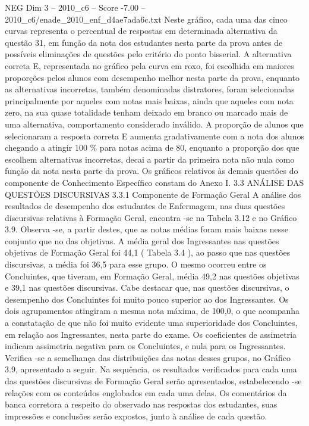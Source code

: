 \begin{textsample}{NEG Dim 3 – 2010\_c6 – Score -7.00 – 2010\_c6/enade\_2010\_enf\_d4ae7ada6c.txt}
Neste gráfico, cada uma das cinco curvas representa o percentual de respostas em determinada alternativa da questão 31, em função da nota dos estudantes nesta parte da prova antes de possíveis eliminações de questões pelo critério do ponto bisserial.
A alternativa correta E, representada no gráfico pela curva em roxo, foi escolhida em maiores proporções pelos alunos com desempenho melhor nesta parte da prova, enquanto as alternativas incorretas, também denominadas distratores, foram selecionadas principalmente por aqueles com notas mais baixas, ainda que aqueles com nota zero, na sua quase totalidade tenham deixado em branco ou marcado mais de uma alternativa, comportamento considerado inválido.
A proporção de alunos que selecionaram a resposta correta E aumenta gradativamente com a nota dos alunos chegando a atingir 100 \% para notas acima de 80, enquanto a proporção dos que escolhem alternativas incorretas, decai a partir da primeira nota não nula como função da nota nesta parte da prova.
Os gráficos relativos às demais questões do componente de Conhecimento Específico constam do Anexo I. 3.3 ANÁLISE DAS QUESTÕES DISCURSIVAS 3.3.1 Componente de Formação Geral A análise dos resultados de desempenho dos estudantes de Enfermagem, nas duas questões discursivas relativas à Formação Geral, encontra -se na Tabela 3.12 e no Gráfico 3.9.
Observa -se, a partir destes, que as notas médias foram mais baixas nesse conjunto que no das objetivas.
A média geral dos Ingressantes nas questões objetivas de Formação Geral foi 44,1 ( Tabela 3.4 ), ao passo que nas questões discursivas, a média foi 36,5 para esse grupo.
O mesmo ocorreu entre os Concluintes, que tiveram, em Formação Geral, média 49,2 nas questões objetivas e 39,1 nas questões discursivas.
Cabe destacar que, nas questões discursivas, o desempenho dos Concluintes foi muito pouco superior ao dos Ingressantes.
Os dois agrupamentos atingiram a mesma nota máxima, de 100,0, o que acompanha a constatação de que não foi muito evidente uma superioridade dos Concluintes, em relação aos Ingressantes, nesta parte do exame.
Os coeficientes de assimetria indicam assimetria negativa para os Concluintes, e nula para os Ingressantes.
Verifica -se a semelhança das distribuições das notas desses grupos, no Gráfico 3.9, apresentado a seguir.
Na sequência, os resultados verificados para cada uma das questões discursivas de Formação Geral serão apresentados, estabelecendo -se relações com os conteúdos englobados em cada uma delas.
Os comentários da banca corretora a respeito do observado nas respostas dos estudantes, suas impressões e conclusões serão expostos, junto à análise de cada questão.

\end{textsample}
